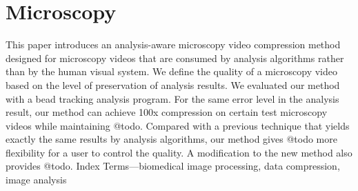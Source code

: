 \chapter{Microscopy}

This paper introduces an analysis-aware microscopy video compression method designed for microscopy videos that are consumed by analysis algorithms rather than by the human visual system. We define the quality of a microscopy video based on the level of preservation of analysis results. We evaluated our method with a bead tracking analysis program. For the same error level in the analysis result, our method can achieve 100x compression on certain test microscopy videos while maintaining @todo. Compared with a previous technique that yields exactly the same results by analysis algorithms, our method gives @todo more flexibility for a user to control the quality.  A modification to the new method also provides @todo.
Index Terms—biomedical image processing, data compression, image analysis

